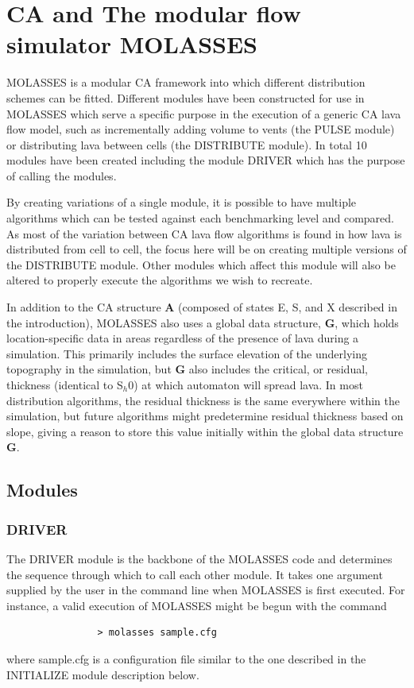 \documentclass[12pt,letter]{article}
\begin{document}

\section{CA and The modular flow simulator MOLASSES}\label{sec:MOLASSES}

	MOLASSES is a modular CA framework into which different distribution schemes can be fitted. Different modules have been constructed for use in MOLASSES which serve a specific purpose in the execution of a generic CA lava flow model, such as incrementally adding volume to vents (the PULSE module) or distributing lava between cells (the DISTRIBUTE module). In total 10 modules have been created including the module DRIVER which has the purpose of calling the modules.
	
	By creating variations of a single module, it is possible to have multiple algorithms which can be tested against each benchmarking level and compared. As most of the variation between CA lava flow algorithms is found in how lava is distributed from cell to cell, the focus here will be on creating multiple versions of the DISTRIBUTE module. Other modules which affect this module will also be altered to properly execute the algorithms we wish to recreate.
	
	In addition to the CA structure \textbf{A} (composed of states E, S, and X described in the introduction), MOLASSES also uses a global data structure, \textbf{G}, which holds location-specific data in areas regardless of the presence of lava during a simulation. This primarily includes the surface elevation of the underlying topography in the simulation, but \textbf{G} also includes the critical, or residual, thickness (identical to S$_h0$) at which automaton will spread lava. In most distribution algorithms, the residual thickness is the same everywhere within the simulation, but future algorithms might predetermine residual thickness based on slope, giving a reason to store this value initially within the global data structure \textbf{G}.

	\subsection{Modules}
		\subsubsection{DRIVER}
			The DRIVER module is the backbone of the MOLASSES code and determines the sequence through which to call each other module. It takes one argument supplied by the user in the command line when MOLASSES is first executed. For instance, a valid execution of MOLASSES might be begun with the command
			\begin{verbatim}
				> molasses sample.cfg
			\end{verbatim}
			where sample.cfg is a configuration file similar to the one described in the INITIALIZE module description below. 
			
\end{document}

